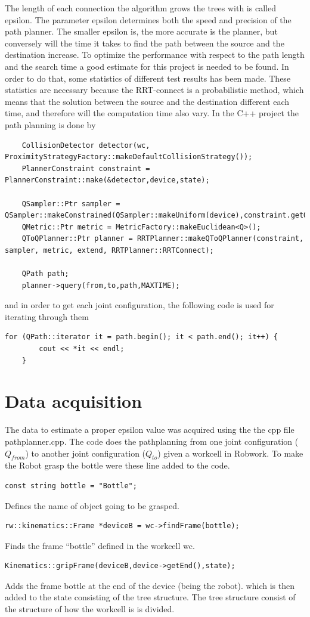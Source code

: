 \documentclass[11pt]{article}
\begin{document}
\noindent The length of each connection the algorithm grows the trees with is called epsilon. The parameter epsilon determines both the speed and precision of the path planner. The smaller epsilon is, the more accurate is the planner, but conversely will the time it takes to find the path between the source and the destination increase. To optimize the performance with respect to the path length and the search time a good estimate for this project is needed to be found. In order to do that, some statistics of different test results has been made. These statistics are necessary because the RRT-connect is a probabilistic method, which means that the solution between the source and the destination different each time, and therefore will the computation time also vary. In the C++ project the path planning is done by 
\begin{lstlisting}
	CollisionDetector detector(wc, ProximityStrategyFactory::makeDefaultCollisionStrategy());
    PlannerConstraint constraint = PlannerConstraint::make(&detector,device,state);

    QSampler::Ptr sampler = QSampler::makeConstrained(QSampler::makeUniform(device),constraint.getQConstraintPtr());
    QMetric::Ptr metric = MetricFactory::makeEuclidean<Q>();
    QToQPlanner::Ptr planner = RRTPlanner::makeQToQPlanner(constraint, sampler, metric, extend, RRTPlanner::RRTConnect);

    QPath path;
    planner->query(from,to,path,MAXTIME);
\end{lstlisting}
and in order to get each joint configuration, the following code is used for iterating through them
\begin{lstlisting}
for (QPath::iterator it = path.begin(); it < path.end(); it++) {
        cout << *it << endl;
    }
\end{lstlisting}

\section{Data acquisition}
The data to estimate a proper epsilon value was acquired using the the cpp file  pathplanner.cpp.    The code does the pathplanning from one joint configuration ($Q_{from}$) to another joint configuration ($Q_{to}$) given a workcell in Robwork.   To make the Robot grasp the bottle were these line added to the code.
\begin{lstlisting}
const string bottle = "Bottle"; 	
\end{lstlisting}
Defines the name of object going to be grasped. 
\begin{lstlisting}
rw::kinematics::Frame *deviceB = wc->findFrame(bottle);
\end{lstlisting}
Finds the frame “bottle” defined in the workcell wc.
\begin{lstlisting}
Kinematics::gripFrame(deviceB,device->getEnd(),state);
\end{lstlisting}
Adds the frame bottle at the end of the device (being the robot). which is then added to the state consisting of the tree structure. The tree structure consist of the structure of how the workcell is is divided.
\end{document}
